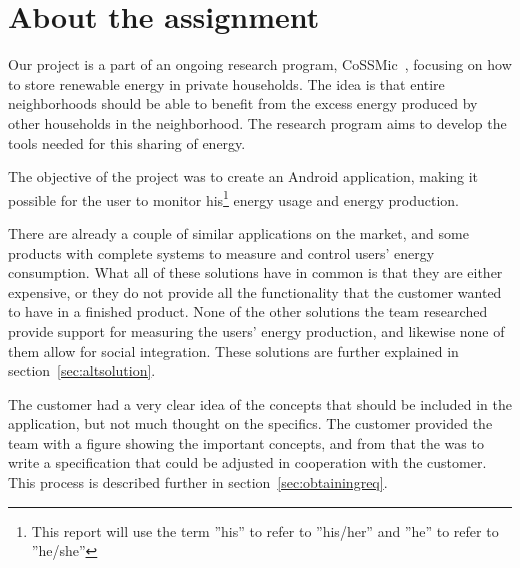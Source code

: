 \section{About the assignment}

Our project is a part of an ongoing research program, CoSSMic~\cite{cossmic}, focusing on how to store renewable energy in private households. 
The idea is that entire neighborhoods should be able to benefit from the excess energy produced by other households in the neighborhood. 
The research program aims to develop the tools needed for this sharing of energy. 

The objective of the project was to create an Android application, making it possible for the user to monitor his\footnote{This report will use the term ''his'' to refer to ''his/her'' and ''he'' to refer to ''he/she''} 
energy usage and energy production. 

There are already a couple of similar applications on the market, and some products with complete systems to measure and control users' energy consumption. 
What all of these solutions have in common is that they are either expensive, or they do not provide all the functionality that the customer wanted to have in a finished product. 
None of the other solutions the team researched provide support for measuring the users' energy production, and likewise none of them allow for social integration. These solutions are further explained in section~\ref{sec:altsolution}.

The customer had a very clear idea of the concepts that should be included in the application, but not much thought on the specifics. The customer provided the team with a figure showing the important concepts, and from that the was to write a specification that could be adjusted in cooperation with the customer. This process is described further in section~\ref{sec:obtainingreq}.